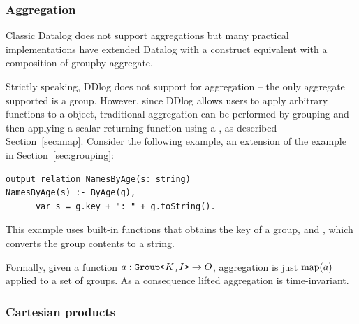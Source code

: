 
\subsubsection{Aggregation}\label{sec:aggregation}

Classic Datalog does not support aggregations
but many practical implementations have extended Datalog with
a construct equivalent with a composition of groupby-aggregate.

Strictly speaking, DDlog does not support for aggregation -- the only
aggregate supported is a group.  However, since DDlog allows users to apply arbitrary
functions to a  object, traditional aggregation can be performed
by grouping and then applying a scalar-returning function using a , as described
Section~\ref{sec:map}.  Consider the following example, an extension of
the example in Section~\ref{sec:grouping}:

\begin{lstlisting}[language=ddlog]
output relation NamesByAge(s: string)
NamesByAge(s) :- ByAge(g),
      var s = g.key + ": " + g.toString().
\end{lstlisting}

This example uses built-in functions  that obtains the key of a group,
and , which converts the group contents to a string.

Formally, given a function $a: \mbox{\texttt{Group<$K$,$I$>}} \to O$,
aggregation is just $\mbox{map}(a)$ applied to a set of groups.  As a consequence
lifted aggregation is time-invariant.

\subsubsection{Cartesian products}\label{sec:cartesian}


